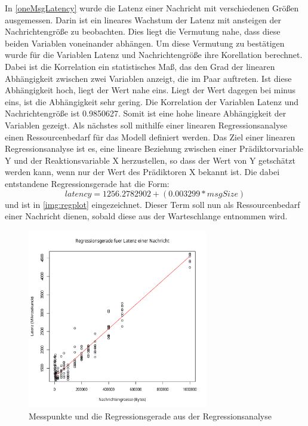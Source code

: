 In \autoref{oneMsgLatency} wurde die Latenz einer Nachricht mit verschiedenen Größen ausgemessen. Darin ist ein lineares Wachstum der Latenz mit ansteigen der Nachrichtengröße zu beobachten. Dies liegt die Vermutung nahe, dass diese beiden Variablen voneinander abhängen. Um diese Vermutung zu bestätigen wurde für die Variablen Latenz und Nachrichtengröße ihre Korellation berechnet. Dabei ist die Korrelation ein statistisches Maß, das den Grad der linearen Abhängigkeit zwischen zwei Variablen anzeigt, die im Paar auftreten. Ist diese Abhängigkeit hoch, liegt der Wert nahe eins. Liegt der Wert dagegen bei minus eins, ist die Abhängigkeit sehr gering. Die Korrelation der Variablen Latenz und Nachrichtengröße ist 0.9850627. Somit ist eine hohe lineare Abhängigkeit der Variablen gezeigt. Als nächstes soll mithilfe einer linearen Regressionsanalyse einen Ressourcenbedarf für das Modell definiert werden. Das Ziel einer linearen Regressionsanalyse ist es, eine lineare Beziehung zwischen einer Prädiktorvariable Y und der Reaktionsvariable X herzustellen, so dass der Wert von Y getschätzt werden kann, wenn nur der Wert des Prädiktoren X bekannt ist. Die dabei entstandene Regressionsgerade hat die Form: \[latency = 1256.2782902 + (0.003299 * msgSize)\] und ist in \autoref{img:regplot} eingezeichnet. Dieser Term soll nun als Ressourcenbedarf einer Nachricht dienen, sobald diese aus der Warteschlange entnommen wird. 
\begin{figure}
\center
  \includegraphics[width=0.7\textwidth]{images/modelling/oneMsgRegression.pdf}
  \caption{Messpunkte und die Regressionsgerade aus der Regressionsanalyse}
  \label{img:regplot}
\end{figure}

